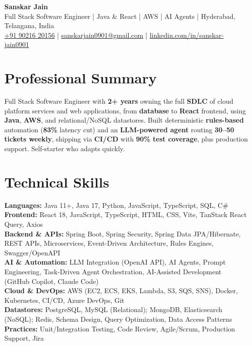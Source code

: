 \documentclass[a4paper,10pt]{article}
\begin{document}
\begin{center}
    {\LARGE \textbf{Sanskar Jain}} \\
    \vspace{2pt}
    Full Stack Software Engineer \;|\; Java \& React \;|\; AWS \;|\; AI Agents \;|\; Hyderabad, Telangana, India \\
    \vspace{2pt}
    \href{tel:+919021620156}{+91 90216 20156} \;|\;
    \href{mailto:sanskarjain0901@gmail.com}{sanskarjain0901@gmail.com} \;|\;
    \href{https://www.linkedin.com/in/sanskar-jain0901/}{linkedin.com/in/sanskar-jain0901}
\end{center}

\section*{Professional Summary}
Full Stack Software Engineer with \textbf{2+ years} owning the full \textbf{SDLC} of cloud platform services and web applications, from \textbf{database} to \textbf{React} frontend, using \textbf{Java}, \textbf{AWS}, and relational/NoSQL datastores.
Built deterministic \textbf{rules-based} automation (\textbf{83\%} latency cut) and an \textbf{LLM-powered agent} routing \textbf{30--50 tickets weekly}, shipping via \textbf{CI/CD} with \textbf{90\% test coverage}, plus production support.
Self-starter who adapts quickly.

\section*{Technical Skills}
\begin{sloppypar}
\noindent
\textbf{Languages:} Java 11+, Java 17, Python, JavaScript, TypeScript, SQL, C\# \\
\textbf{Frontend:} React 18, JavaScript, TypeScript, HTML, CSS, Vite, TanStack React Query, Axios \\
\textbf{Backend \& APIs:} Spring Boot, Spring Security, Spring Data JPA/Hibernate, REST APIs, Microservices, Event-Driven Architecture, Rules Engines, Swagger/OpenAPI \\
\textbf{AI \& Automation:} LLM Integration (OpenAI API), AI Agents, Prompt Engineering, Task-Driven Agent Orchestration, AI-Assisted Development (GitHub Copilot, Claude Code) \\
\textbf{Cloud \& DevOps:} AWS (EC2, ECS, EKS, Lambda, S3, SQS, SNS), Docker, Kubernetes, CI/CD, Azure DevOps, Git \\
\textbf{Datastores:} PostgreSQL, MySQL (Relational); MongoDB, Elasticsearch (NoSQL); Redis, Schema Design, Query Optimization, Data Access Patterns \\
\textbf{Practices:} Unit/Integration Testing, Code Review, Agile/Scrum, Production Support, Jira
\end{sloppypar}
\end{document}
